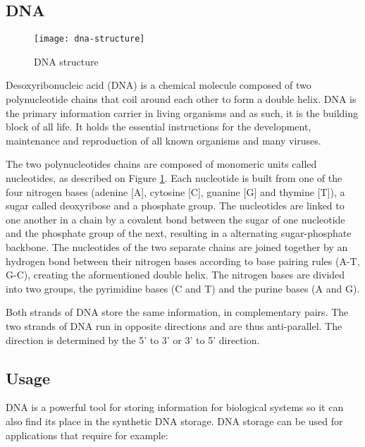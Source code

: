 \subsection{DNA}

\begin{figure}
    \centering
    \texttt{[image: dna-structure]}
    \caption{DNA structure}
    \label{fig:dna-structure}
\end{figure}

Desoxyribonucleic acid (DNA) is a chemical molecule composed of two polynucleotide chains that coil around each other to form a double helix. DNA is the primary information carrier in living organisms and as such, it is the building block of all life. It holds the essential instructions for the development, maintenance and reproduction of all known organisms and many viruses. 

The two polynucleotides chains are composed of monomeric units called nucleotides, as described on Figure \ref{fig:dna-structure}.
Each nucleotide is built from one of the four nitrogen bases (adenine [A], cytosine [C], guanine [G] and thymine [T]), a sugar called deoxyribose and a phosphate group.
The nucleotides are linked to one another in a chain by a covalent bond between the sugar of one nucleotide and the phosphate group of the next, resulting in a alternating sugar-phosphate backbone.
The nucleotides of the two separate chains are joined together by an hydrogen bond between their nitrogen bases according to base pairing rules (A-T, G-C), creating the aformentioned double helix.
The nitrogen bases are divided into two groups, the pyrimidine bases (C and T) and the purine bases (A and G).

Both strands of DNA store the same information, in complementary pairs. The two strands of DNA run in opposite directions and are thus anti-parallel. The direction is determined by the 5' to 3' or 3' to 5' direction.

\subsection{Usage}

DNA is a powerful tool for storing information for biological systems so it can also find its place in the synthetic DNA storage.
DNA storage can be used for applications that require for example:

